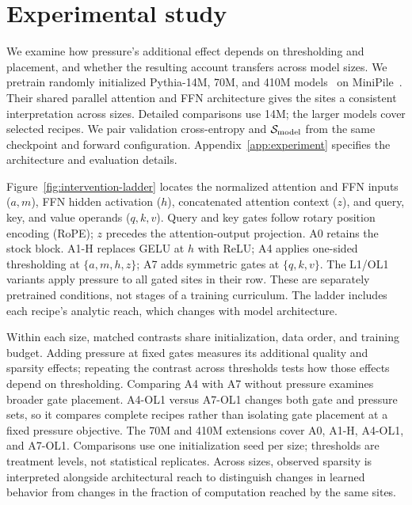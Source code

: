 \section{Experimental study}
\label{sec:experiments}

We examine how pressure's additional effect depends on thresholding and
placement, and whether the resulting account transfers across model sizes.
We pretrain randomly initialized Pythia-14M, 70M, and 410M
models~\citep{biderman2023pythia} on MiniPile~\citep{kaddour2023minipile}.
Their shared parallel attention and FFN architecture gives the sites a
consistent interpretation across sizes. Detailed comparisons use 14M;
the larger models cover selected recipes. We pair validation cross-entropy
and $\mathcal{S}_{\mathrm{model}}$ from the same checkpoint and forward configuration.
Appendix~\ref{app:experiment} specifies the architecture and evaluation details.

Figure~\ref{fig:intervention-ladder} locates the normalized attention and
FFN inputs ($a,m$), FFN hidden activation ($h$), concatenated attention
context ($z$), and query, key, and value operands ($q,k,v$).
Query and key gates follow rotary position encoding (RoPE); $z$ precedes
the attention-output projection. A0 retains the stock block. A1-H replaces
GELU at $h$ with ReLU; A4 applies one-sided thresholding at $\{a,m,h,z\}$;
A7 adds symmetric gates at $\{q,k,v\}$. The L1/OL1 variants apply pressure
to all gated sites in their row. These are separately pretrained conditions,
not stages of a training curriculum. The ladder includes each recipe's
analytic reach, which changes with model architecture.

Within each size, matched contrasts share initialization, data order, and
training budget. Adding pressure at fixed gates measures its additional
quality and sparsity effects; repeating the contrast across thresholds tests
how those effects depend on thresholding. Comparing A4 with A7 without
pressure examines broader gate placement. A4-OL1 versus A7-OL1 changes both
gate and pressure sets, so it compares complete recipes rather than isolating
gate placement at a fixed pressure objective. The 70M and 410M extensions
cover A0, A1-H, A4-OL1, and A7-OL1. Comparisons use one initialization seed
per size; thresholds are treatment levels, not statistical replicates.
Across sizes, observed sparsity is interpreted alongside architectural reach
to distinguish changes in learned behavior from changes in the fraction of
computation reached by the same sites.

